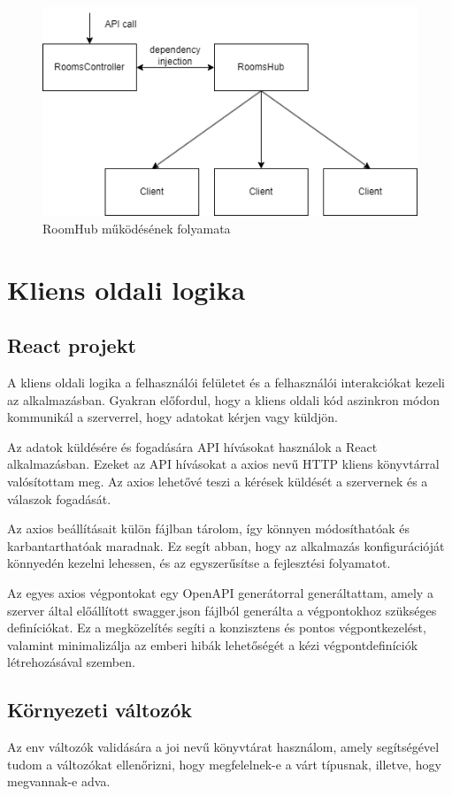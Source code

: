 \begin{figure}[H]
    \centering
    \includegraphics[width=14.0truecm]{images/roomshub.png}
    \caption{RoomHub működésének folyamata}
    \label{fig:frontend_architecture}
\end{figure}

\section{Kliens oldali logika}
\subsection{React projekt}
A kliens oldali logika a felhasználói felületet és a felhasználói interakciókat kezeli az alkalmazásban. Gyakran előfordul, hogy a kliens oldali kód aszinkron módon kommunikál a szerverrel, hogy adatokat kérjen vagy küldjön.

Az adatok küldésére és fogadására API hívásokat használok a React alkalmazásban. Ezeket az API hívásokat a axios \cite[]{axios} nevű HTTP kliens könyvtárral valósítottam meg. Az axios lehetővé teszi a kérések küldését a szervernek és a válaszok fogadását.

Az axios beállításait külön fájlban tárolom, így könnyen módosíthatóak és karbantarthatóak maradnak. Ez segít abban, hogy az alkalmazás konfigurációját könnyedén kezelni lehessen, és az egyszerűsítse a fejlesztési folyamatot.

Az egyes axios végpontokat egy OpenAPI generátorral generáltattam, amely a szerver által előállított swagger.json fájlból generálta a végpontokhoz szükséges definíciókat. Ez a megközelítés segíti a konzisztens és pontos végpontkezelést, valamint minimalizálja az emberi hibák lehetőségét a kézi végpontdefiníciók létrehozásával szemben.

\subsection{Környezeti változók}
Az env változók validására a joi \cite[]{joi} nevű könyvtárat használom, amely segítségével tudom a változókat ellenőrizni, hogy megfelelnek-e a várt típusnak, illetve, hogy megvannak-e adva.


